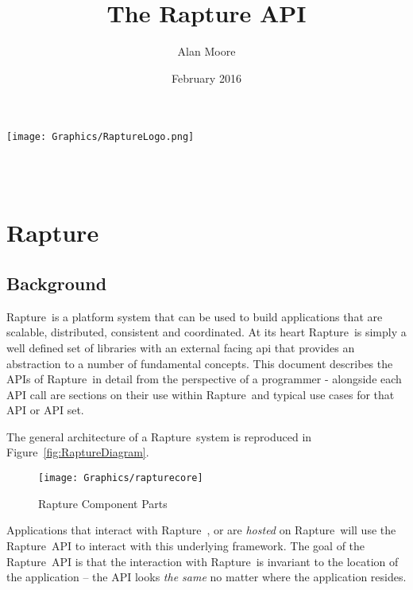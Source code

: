 \documentclass[12pt,twoside,a4paper]{book}
\newcommand{\Rapture}{Rapture~}
\begin{document}
\title{The Rapture API}
\author{Alan Moore}
\date{February 2016}

\makeatletter
    \begin{titlepage}
      \texttt{[image: Graphics/RaptureLogo.png]}\\[4ex]
        \begin{center}
            {\huge \bfseries  \@title }\\[2ex]
            {\LARGE  \@author}\\[50ex]
            {\large \@date}
        \end{center}
    \end{titlepage}
\makeatother
\thispagestyle{empty}
\newpage


\tableofcontents
\setcounter{page}{1} %


\part{Rapture}
\chapter{Background}
\Rapture is a platform system that can be used to build applications that are scalable,
distributed, consistent and coordinated. At its heart \Rapture is simply a well defined
set of libraries with an external facing api that provides an abstraction to a number
of fundamental concepts. This document describes the APIs of \Rapture in detail from the
perspective of a programmer - alongside each API call are sections on their use within
\Rapture and typical use cases for that API or API set.

The general architecture of a \Rapture system is reproduced in Figure~\vref{fig:RaptureDiagram}.

\begin{figure}[htb]
\centering
\texttt{[image: Graphics/rapturecore]}
\caption{Rapture Component Parts}
\label{fig:RaptureDiagram}
\end{figure}

Applications that interact with \Rapture, or are \emph{hosted} on \Rapture will
use the \Rapture API to interact with this underlying framework. The goal of
the \Rapture API is that the interaction with \Rapture is invariant to the location
of the application -- the API looks \emph{the same} no matter where the application
resides.
\end{document}
